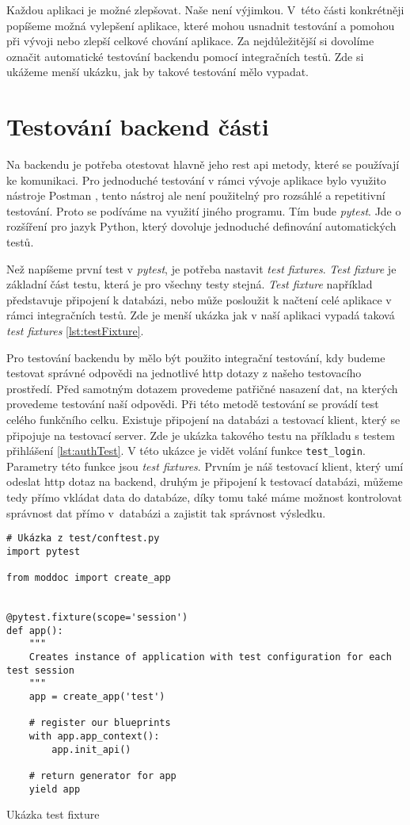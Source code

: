 Každou aplikaci je možné zlepšovat. Naše není výjimkou. V~této části konkrétněji popíšeme možná vylepšení aplikace,
které mohou usnadnit testování a pomohou při vývoji nebo zlepší celkové chování aplikace. Za nejdůležitější si dovolíme označit
automatické testování backendu pomocí integračních testů. Zde si ukážeme menší ukázku, jak by takové testování mělo vypadat.

\section{Testování backend části}

Na backendu je potřeba otestovat hlavně jeho \gls{rest} \gls{api} metody, které se používají ke komunikaci. Pro jednoduché
testování v rámci vývoje aplikace bylo využito nástroje Postman \cite{postmanSW}, tento nástroj ale není použitelný pro rozsáhlé
a repetitivní testování. Proto se podíváme na využití jiného programu. Tím bude \textit{pytest}. Jde o rozšíření pro jazyk Python,
který dovoluje jednoduché definování automatických testů.

Než napíšeme první test v \textit{pytest}, je potřeba nastavit \textit{test fixtures}. \textit{Test fixture} je základní část
testu, která je pro všechny testy stejná. \textit{Test fixture} například představuje připojení k databázi, nebo může posloužit k načtení
celé aplikace v rámci integračních testů. Zde je menší ukázka jak v naší aplikaci vypadá taková \textit{test fixtures} \ref{lst:testFixture}.

Pro testování backendu by mělo být použito integrační testování, kdy budeme testovat správné odpovědi na jednotlivé \gls{http} dotazy z našeho
testovacího prostředí. Před samotným dotazem provedeme patřičné nasazení dat, na kterých provedeme testování naší odpovědi. Při této metodě
testování se provádí test celého funkčního celku. Existuje připojení na databázi a testovací
klient, který se připojuje na testovací server. Zde je ukázka takového testu na příkladu s testem přihlášení \ref{lst:authTest}. V této ukázce
je vidět volání funkce \texttt{test\_login}. Parametry této funkce jsou \textit{test fixtures}. Prvním je náš testovací klient, který umí odeslat
\gls{http} dotaz na backend, druhým je připojení k testovací databázi, můžeme tedy přímo vkládat data do databáze, díky tomu také máme
možnost kontrolovat správnost dat přímo v~databázi a zajistit tak správnost výsledku.

\begin{listing}[h]
    \begin{verbatim}
# Ukázka z test/conftest.py
import pytest

from moddoc import create_app


@pytest.fixture(scope='session')
def app():
    """
    Creates instance of application with test configuration for each test session
    """
    app = create_app('test')

    # register our blueprints
    with app.app_context():
        app.init_api()

    # return generator for app
    yield app
    \end{verbatim}
    \caption{Ukázka test fixture}
    \label{lst:testFixture}
\end{listing}

